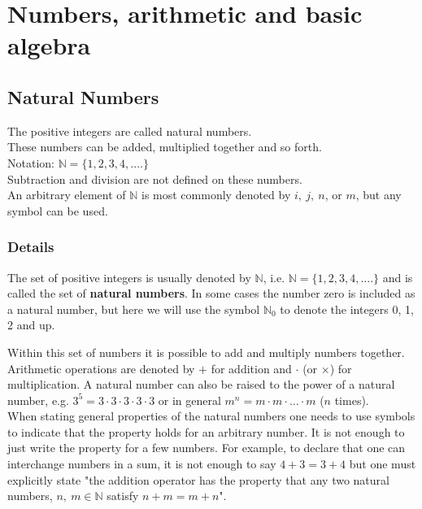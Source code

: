 \documentclass[12pt,a4paper]{article}
\theoremstyle{regla}
\theoremstyle{remark}
\theoremstyle{definition}
\theoremstyle{nonumberbreak}
\begin{document}
\newpage
\tableofcontents
\newpage
\section{Numbers, arithmetic and basic algebra}
\subsection{Natural Numbers}
\begin{fbox}
\begin{minipage}{0.97\textwidth}
The positive integers are called natural numbers.\\

These numbers can be added, multiplied together and so forth.\\

Notation: $\mathbb{N}=\{1,2,3,4,....\}$ \\

Subtraction and division are not defined on these numbers.\\

An arbitrary element of $\mathbb{N}$ is most commonly denoted by $i,\ j,\ n$, or $m$, but any symbol can be used.
\end{minipage}
\end{fbox}
\subsubsection{Details}
\begin{defn}
The set of positive integers is usually denoted by $\mathbb{N}$, i.e.
$\mathbb{N}=\{1,2,3,4,....\}$ and is called the set of \textbf{natural numbers}. In some cases the number zero is included as a natural number, but here we will use the symbol $\mathbb{N}_0$ to denote the integers 0, 1, 2 and up.
\end{defn}

Within this set of numbers it is possible to add and multiply numbers together. Arithmetic operations are denoted by $+$ for addition and $\cdot$ (or $\times$) for multiplication. A natural number can also be raised to the power of a natural number, e.g. $3^5=3\cdot 3\cdot 3\cdot 3\cdot 3$ 
or in general $m^n=m\cdot m \cdot \ldots \cdot m$ ($n$ times).\\

When stating general properties of the natural numbers one needs to use symbols to indicate that the property holds for an arbitrary number. It is not enough to just write the property for a few numbers. For example, to declare that one can interchange numbers in a sum, it is not enough to say $4+3=3+4$ but one must explicitly state "the addition operator has the property that any two natural numbers, $n,\ m\in \mathbb{N}$ satisfy $n+m=m+n$".\\
\end{document}

